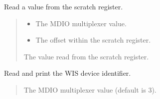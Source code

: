 \documentclass[letterpaper,10pt,english]{sphinxmanual}
\begin{document}
\begin{fulllineitems}
\label{\detokenize{cplddocs:phy_marvell_88X2222_init.read_scratch}}
\pysigstartsignatures
{}
\pysigstopsignatures
\sphinxAtStartPar
Read a value from the scratch register.
\begin{quote}\begin{description}
\begin{itemize}
\item {} 
\sphinxAtStartPar
{} \textendash{} The MDIO multiplexer value.

\item {} 
\sphinxAtStartPar
{} \textendash{} The offset within the scratch register.

\end{itemize}

\sphinxAtStartPar
The value read from the scratch register.

\end{description}\end{quote}

\end{fulllineitems}


\begin{fulllineitems}
\label{\detokenize{cplddocs:phy_marvell_88X2222_init.read_wis}}
\pysigstartsignatures
{}
\pysigstopsignatures
\sphinxAtStartPar
Read and print the WIS device identifier.
\begin{quote}\begin{description}
\sphinxAtStartPar
{} \textendash{} The MDIO multiplexer value (default is 3).

\end{description}\end{quote}

\end{fulllineitems}
\end{document}
